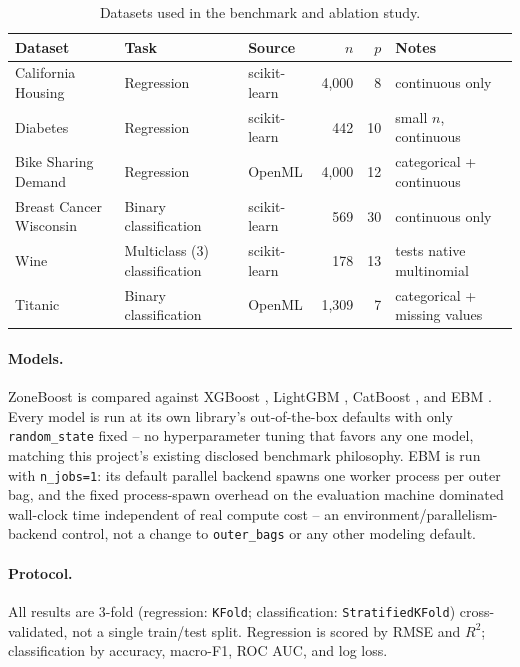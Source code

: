 \documentclass[11pt]{article}
\begin{document}
\begin{table}[t]
\centering
\caption{Datasets used in the benchmark and ablation study.}
\label{tab:datasets}
\begin{tabular}{lllrrl}
\toprule
Dataset & Task & Source & $n$ & $p$ & Notes \\
\midrule
California Housing & Regression & scikit-learn & 4{,}000 & 8 & continuous only \\
Diabetes & Regression & scikit-learn & 442 & 10 & small $n$, continuous \\
Bike Sharing Demand & Regression & OpenML & 4{,}000 & 12 & categorical + continuous \\
Breast Cancer Wisconsin & Binary classification & scikit-learn & 569 & 30 & continuous only \\
Wine & Multiclass (3) classification & scikit-learn & 178 & 13 & tests native multinomial \\
Titanic & Binary classification & OpenML & 1{,}309 & 7 & categorical + missing values \\
\bottomrule
\end{tabular}
\end{table}

\paragraph{Models.} ZoneBoost is compared against XGBoost
\citep{chen2016xgboost}, LightGBM \citep{ke2017lightgbm}, CatBoost
\citep{prokhorenkova2018catboost}, and EBM \citep{nori2019interpretml}. Every
model is run at its own library's out-of-the-box defaults with only
\texttt{random\_state} fixed -- no hyperparameter tuning that favors any one
model, matching this project's existing disclosed benchmark philosophy. EBM
is run with \texttt{n\_jobs=1}: its default parallel backend spawns one
worker process per outer bag, and the fixed process-spawn overhead on the
evaluation machine dominated wall-clock time independent of real compute
cost -- an environment/parallelism-backend control, not a change to
\texttt{outer\_bags} or any other modeling default.

\paragraph{Protocol.} All results are 3-fold (regression: \texttt{KFold};
classification: \texttt{StratifiedKFold}) cross-validated, not a single
train/test split. Regression is scored by RMSE and $R^2$; classification by
accuracy, macro-F1, ROC AUC, and log loss.
\end{document}
